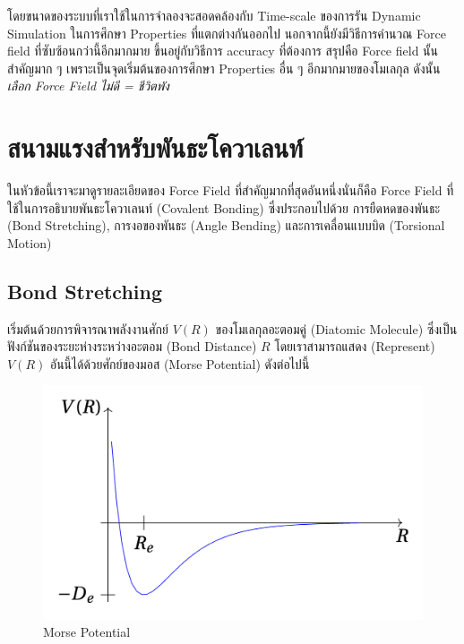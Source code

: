 โดยขนาดของระบบที่เราใช้ในการจำลองจะสอดคล้องกับ Time-scale ของการรัน Dynamic Simulation ในการศึกษา Properties
ที่แตกต่างกันออกไป นอกจากนี้ยังมีวิธีการคำนวณ Force field ที่ซับซ้อนกว่านี้อีกมากมาย ขึ้นอยู่กับวิธีการ accuracy ที่ต้องการ
สรุปคือ Force field นั้นสำคัญมาก ๆ เพราะเป็นจุดเริ่มต้นของการศึกษา Properties อื่น ๆ อีกมากมายของโมเลกุล ดังนั้น
\textit{เลือก Force Field ไม่ดี = ชีวิตพัง}

\section{สนามแรงสำหรับพันธะโควาเลนท์}
\label{sec:md_ff_covalent_bond}

ในหัวข้อนี้เราจะมาดูรายละเอียดของ Force Field ที่สำคัญมากที่สุดอันหนึ่งนั่นก็คือ Force Field ที่ใช้ในการอธิบายพันธะโควาเลนท์ (Covalent
Bonding) ซึ่งประกอบไปด้วย การยืดหดของพันธะ (Bond Stretching), การงอของพันธะ (Angle Bending) และการเคลื่อนแบบบิด (Torsional
Motion)

\subsection{Bond Stretching}

เริ่มต้นด้วยการพิจารณาพลังงานศักย์ $V(R)$ ของโมเลกุลอะตอมคู่ (Diatomic Molecule) ซึ่งเป็นฟังก์ชันของระยะห่างระหว่างอะตอม
(Bond Distance) $R$ โดยเราสามารถแสดง (Represent) $V(R)$ อันนี้ได้ด้วยศักย์ของมอส (Morse Potential) ดังต่อไปนี้

\begin{figure}[htbp]
    \centering
    \includegraphics[width=0.8\linewidth]{fig/morse-potential.png}
    \caption{Morse Potential}
    \label{fig:morse_potential}
\end{figure}

